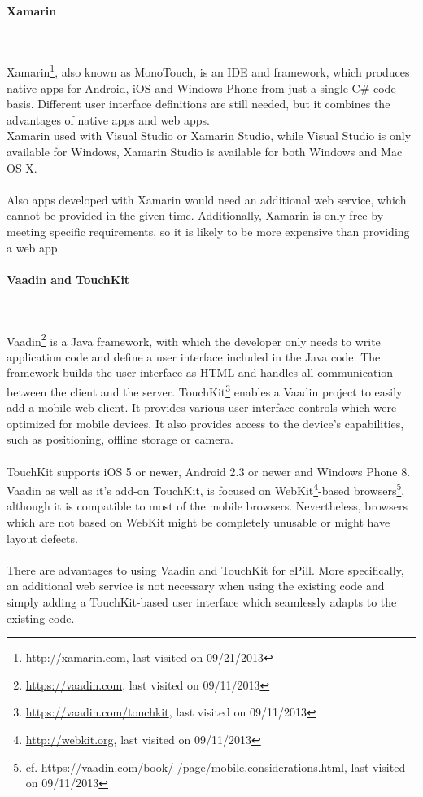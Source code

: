 \paragraph{Xamarin}$\;$

\vspace{0.75em}
Xamarin\footnote{\url{http://xamarin.com}, last visited on 09/21/2013}, also known as MonoTouch, is an IDE and framework, which produces native apps for Android, iOS and Windows Phone from just a single C\# code basis. Different user interface definitions are still needed, but it combines the advantages of native apps and web apps. 
\\
Xamarin used with Visual Studio or Xamarin Studio, while Visual Studio is only available for Windows, Xamarin Studio is available for both Windows and Mac OS X.
\\
\\
Also apps developed with Xamarin would need an additional web service, which cannot be provided in the given time. Additionally, Xamarin is only free by meeting specific requirements, so it is likely to be more expensive than providing a web app.

\paragraph{Vaadin and TouchKit}$\;$

\vspace{0.75em}
Vaadin\footnote{\url{https://vaadin.com}, last visited on 09/11/2013} is a Java framework, with which the developer only needs to write application code and define a user interface included in the Java code. The framework builds the user interface as HTML and handles all communication between the client and the server. TouchKit\footnote{\url{https://vaadin.com/touchkit}, last visited on 09/11/2013} enables a Vaadin project to easily add a mobile web client. It provides various user interface controls which were optimized for mobile devices. It also provides access to the device's capabilities, such as positioning, offline storage or camera.
\\
\\
TouchKit supports iOS 5 or newer, Android 2.3 or newer and Windows Phone 8. Vaadin as well as it's add-on TouchKit, is focused on WebKit\footnote{\url{http://webkit.org}, last visited on 09/11/2013}-based browsers\footnote{cf. \url{https://vaadin.com/book/-/page/mobile.considerations.html}, last visited on 09/11/2013}, although it is compatible to most of the mobile browsers. Nevertheless, browsers which are not based on WebKit might be completely unusable or might have layout defects.
\\
\\
There are advantages to using Vaadin and TouchKit for ePill. More specifically, an additional web service is not necessary when using the existing code and simply adding a TouchKit-based user interface which seamlessly adapts to the existing code.


